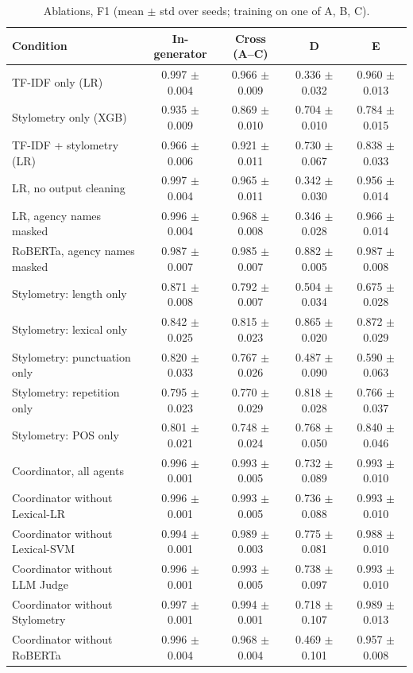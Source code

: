 \begin{table}[t]
\centering
\footnotesize
\caption{Ablations, F1 (mean $\pm$ std over seeds; training on one of A, B, C).}
\label{tab:ablation}
\begin{tabular}{lcccc}
\toprule
Condition & In-generator & Cross (A--C) & D & E \\
\midrule
TF-IDF only (LR) & 0.997 $\pm$ 0.004 & 0.966 $\pm$ 0.009 & 0.336 $\pm$ 0.032 & 0.960 $\pm$ 0.013 \\
Stylometry only (XGB) & 0.935 $\pm$ 0.009 & 0.869 $\pm$ 0.010 & 0.704 $\pm$ 0.010 & 0.784 $\pm$ 0.015 \\
TF-IDF + stylometry (LR) & 0.966 $\pm$ 0.006 & 0.921 $\pm$ 0.011 & 0.730 $\pm$ 0.067 & 0.838 $\pm$ 0.033 \\
LR, no output cleaning & 0.997 $\pm$ 0.004 & 0.965 $\pm$ 0.011 & 0.342 $\pm$ 0.030 & 0.956 $\pm$ 0.014 \\
LR, agency names masked & 0.996 $\pm$ 0.004 & 0.968 $\pm$ 0.008 & 0.346 $\pm$ 0.028 & 0.966 $\pm$ 0.014 \\
RoBERTa, agency names masked & 0.987 $\pm$ 0.007 & 0.985 $\pm$ 0.007 & 0.882 $\pm$ 0.005 & 0.987 $\pm$ 0.008 \\
Stylometry: length only & 0.871 $\pm$ 0.008 & 0.792 $\pm$ 0.007 & 0.504 $\pm$ 0.034 & 0.675 $\pm$ 0.028 \\
Stylometry: lexical only & 0.842 $\pm$ 0.025 & 0.815 $\pm$ 0.023 & 0.865 $\pm$ 0.020 & 0.872 $\pm$ 0.029 \\
Stylometry: punctuation only & 0.820 $\pm$ 0.033 & 0.767 $\pm$ 0.026 & 0.487 $\pm$ 0.090 & 0.590 $\pm$ 0.063 \\
Stylometry: repetition only & 0.795 $\pm$ 0.023 & 0.770 $\pm$ 0.029 & 0.818 $\pm$ 0.028 & 0.766 $\pm$ 0.037 \\
Stylometry: POS only & 0.801 $\pm$ 0.021 & 0.748 $\pm$ 0.024 & 0.768 $\pm$ 0.050 & 0.840 $\pm$ 0.046 \\
Coordinator, all agents & 0.996 $\pm$ 0.001 & 0.993 $\pm$ 0.005 & 0.732 $\pm$ 0.089 & 0.993 $\pm$ 0.010 \\
Coordinator without Lexical-LR & 0.996 $\pm$ 0.001 & 0.993 $\pm$ 0.005 & 0.736 $\pm$ 0.088 & 0.993 $\pm$ 0.010 \\
Coordinator without Lexical-SVM & 0.994 $\pm$ 0.001 & 0.989 $\pm$ 0.003 & 0.775 $\pm$ 0.081 & 0.988 $\pm$ 0.010 \\
Coordinator without LLM Judge & 0.996 $\pm$ 0.001 & 0.993 $\pm$ 0.005 & 0.738 $\pm$ 0.097 & 0.993 $\pm$ 0.010 \\
Coordinator without Stylometry & 0.997 $\pm$ 0.001 & 0.994 $\pm$ 0.001 & 0.718 $\pm$ 0.107 & 0.989 $\pm$ 0.013 \\
Coordinator without RoBERTa & 0.996 $\pm$ 0.004 & 0.968 $\pm$ 0.004 & 0.469 $\pm$ 0.101 & 0.957 $\pm$ 0.008 \\
\bottomrule
\end{tabular}
\end{table}
